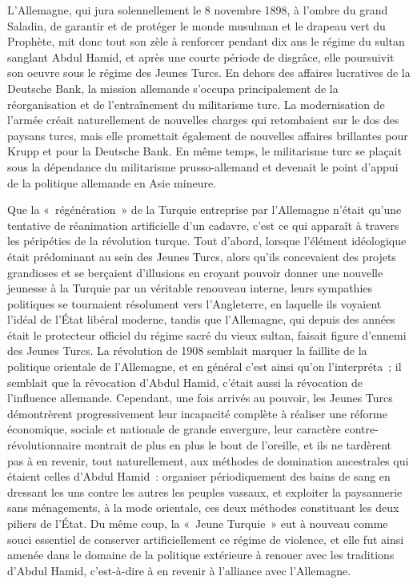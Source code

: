 \documentclass[french,twoside]{book} %
\begin{document}
\noindent L'Allemagne, qui jura solennellement le 8 novembre 1898, à l’ombre du grand Saladin, de garantir et de protéger le monde musulman et le drapeau vert du Prophète, mit donc tout son zèle à renforcer pendant dix ans le régime du sultan sanglant Abdul Hamid, et après une courte période de disgrâce, elle poursuivit son oeuvre sous le régime des Jeunes Turcs. En dehors des affaires lucratives de la Deutsche Bank, la mission allemande s’occupa principalement de la réorganisation et de l’entraînement du militarisme turc. La modernisation de l’armée créait naturellement de nouvelles charges qui retombaient sur le dos des paysans turcs, mais elle promettait également de nouvelles affaires brillantes pour Krupp et pour la Deutsche Bank. En même temps, le militarisme turc se plaçait sous la dépendance du militarisme prusso-allemand et devenait le point d’appui de la politique allemande en Asie mineure.\par
Que la « régénération » de la Turquie entreprise par l’Allemagne n’était qu’une tentative de réanimation artificielle d’un cadavre, c’est ce qui apparaît à travers les péripéties de la révolution turque. Tout d’abord, lorsque l’élément idéologique était prédominant au sein des Jeunes Turcs, alors qu’ils concevaient des projets grandioses et se berçaient d’illusions en croyant pouvoir donner une nouvelle jeunesse à la Turquie par un véritable renouveau interne, leurs sympathies politiques se tournaient résolument vers l’Angleterre, en laquelle ils voyaient l’idéal de l’État libéral moderne, tandis que l’Allemagne, qui depuis des années était le protecteur officiel du régime sacré du vieux sultan, faisait figure d’ennemi des Jeunes Turcs. La révolution de 1908 semblait marquer la faillite de la politique orientale de l’Allemagne, et en général c’est ainsi qu’on l’interpréta ; il semblait que la révocation d’Abdul Hamid, c’était aussi la révocation de l’influence allemande. Cependant, une fois arrivés au pouvoir, les Jeunes Turcs démontrèrent progressivement leur incapacité complète à réaliser une réforme économique, sociale et nationale de grande envergure, leur caractère contre-révolutionnaire montrait de plus en plus le bout de l’oreille, et ils ne tardèrent pas à en revenir, tout naturellement, aux méthodes de domination ancestrales qui étaient celles d’Abdul Hamid : organiser périodiquement des bains de sang en dressant les uns contre  les autres les peuples vassaux, et exploiter la paysannerie sans ménagements, à la mode orientale, ces deux méthodes constituant les deux piliers de l’État. Du même coup, la « Jeune Turquie » eut à nouveau comme souci essentiel de conserver artificiellement ce régime de violence, et elle fut ainsi amenée dans le domaine de la politique extérieure à renouer avec les traditions d’Abdul Hamid, c’est-à-dire à en revenir à l’alliance avec l’Allemagne.\par
\end{document}
